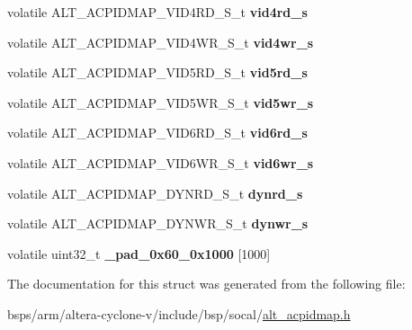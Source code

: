 \begin{DoxyCompactItemize}
\mbox{\label{structALT__ACPIDMAP__s_a3b6993c20ced3cf96cb012028e84e987}} 
volatile A\+L\+T\+\_\+\+A\+C\+P\+I\+D\+M\+A\+P\+\_\+\+V\+I\+D4\+R\+D\+\_\+\+S\+\_\+t {\bfseries vid4rd\+\_\+s}
\item 
\mbox{\label{structALT__ACPIDMAP__s_a7c7261ef2169c2d86e1d03a08b30efff}} 
volatile A\+L\+T\+\_\+\+A\+C\+P\+I\+D\+M\+A\+P\+\_\+\+V\+I\+D4\+W\+R\+\_\+\+S\+\_\+t {\bfseries vid4wr\+\_\+s}
\item 
\mbox{\label{structALT__ACPIDMAP__s_a7a28f407c7585b2ff2ea83253dc41f34}} 
volatile A\+L\+T\+\_\+\+A\+C\+P\+I\+D\+M\+A\+P\+\_\+\+V\+I\+D5\+R\+D\+\_\+\+S\+\_\+t {\bfseries vid5rd\+\_\+s}
\item 
\mbox{\label{structALT__ACPIDMAP__s_a0abf54d4f932ab78fef1b39f5d326c04}} 
volatile A\+L\+T\+\_\+\+A\+C\+P\+I\+D\+M\+A\+P\+\_\+\+V\+I\+D5\+W\+R\+\_\+\+S\+\_\+t {\bfseries vid5wr\+\_\+s}
\item 
\mbox{\label{structALT__ACPIDMAP__s_afb0217c3e5a809aa8757321d823c7f10}} 
volatile A\+L\+T\+\_\+\+A\+C\+P\+I\+D\+M\+A\+P\+\_\+\+V\+I\+D6\+R\+D\+\_\+\+S\+\_\+t {\bfseries vid6rd\+\_\+s}
\item 
\mbox{\label{structALT__ACPIDMAP__s_aabef8aa33d408df11a1d981bd276da96}} 
volatile A\+L\+T\+\_\+\+A\+C\+P\+I\+D\+M\+A\+P\+\_\+\+V\+I\+D6\+W\+R\+\_\+\+S\+\_\+t {\bfseries vid6wr\+\_\+s}
\item 
\mbox{\label{structALT__ACPIDMAP__s_aa2ef28a95326b71482e3e6b909e5980a}} 
volatile A\+L\+T\+\_\+\+A\+C\+P\+I\+D\+M\+A\+P\+\_\+\+D\+Y\+N\+R\+D\+\_\+\+S\+\_\+t {\bfseries dynrd\+\_\+s}
\item 
\mbox{\label{structALT__ACPIDMAP__s_a04bc73dd840ed14975f8a2ccecca4cfb}} 
volatile A\+L\+T\+\_\+\+A\+C\+P\+I\+D\+M\+A\+P\+\_\+\+D\+Y\+N\+W\+R\+\_\+\+S\+\_\+t {\bfseries dynwr\+\_\+s}
\item 
\mbox{\label{structALT__ACPIDMAP__s_af1f8815352033c27ad0ef53bb8297877}} 
volatile uint32\+\_\+t {\bfseries \+\_\+pad\+\_\+0x60\+\_\+0x1000} \mbox{[}1000\mbox{]}
\end{DoxyCompactItemize}


The documentation for this struct was generated from the following file\+:\begin{DoxyCompactItemize}
\item 
bsps/arm/altera-\/cyclone-\/v/include/bsp/socal/\mbox{\hyperlink{alt__acpidmap_8h}{alt\+\_\+acpidmap.\+h}}\end{DoxyCompactItemize}
